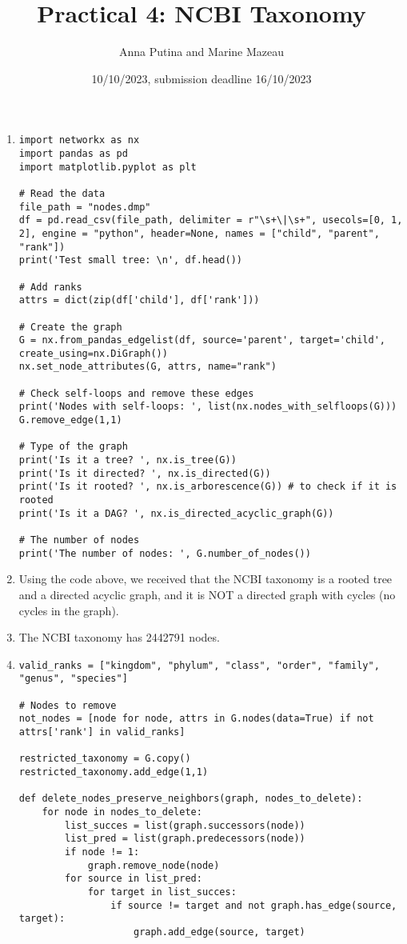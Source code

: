 \documentclass[12 pt,a4paper]{article}
\title{Practical 4: NCBI Taxonomy}
\author{Anna Putina and Marine Mazeau}
\date{10/10/2023, submission deadline 16/10/2023}
\begin{document}
\maketitle
\begin{enumerate}
\item
{}
\begin{verbatim}
import networkx as nx
import pandas as pd
import matplotlib.pyplot as plt

# Read the data
file_path = "nodes.dmp"
df = pd.read_csv(file_path, delimiter = r"\s+\|\s+", usecols=[0, 1, 2], engine = "python", header=None, names = ["child", "parent", "rank"]) 
print('Test small tree: \n', df.head())

# Add ranks
attrs = dict(zip(df['child'], df['rank']))

# Create the graph
G = nx.from_pandas_edgelist(df, source='parent', target='child', create_using=nx.DiGraph())
nx.set_node_attributes(G, attrs, name="rank")

# Check self-loops and remove these edges
print('Nodes with self-loops: ', list(nx.nodes_with_selfloops(G)))
G.remove_edge(1,1)

# Type of the graph
print('Is it a tree? ', nx.is_tree(G))
print('Is it directed? ', nx.is_directed(G))
print('Is it rooted? ', nx.is_arborescence(G)) # to check if it is rooted
print('Is it a DAG? ', nx.is_directed_acyclic_graph(G))

# The number of nodes
print('The number of nodes: ', G.number_of_nodes())
\end{verbatim}
\item
Using the code above, we received that the NCBI taxonomy is a rooted tree and a directed acyclic graph, and it is NOT a directed graph with cycles (no cycles in the graph).

\item 
The NCBI taxonomy has 2442791 nodes.
\item 
{}
\begin{verbatim}
valid_ranks = ["kingdom", "phylum", "class", "order", "family", "genus", "species"]

# Nodes to remove
not_nodes = [node for node, attrs in G.nodes(data=True) if not attrs['rank'] in valid_ranks]

restricted_taxonomy = G.copy()
restricted_taxonomy.add_edge(1,1)

def delete_nodes_preserve_neighbors(graph, nodes_to_delete):
    for node in nodes_to_delete:
        list_succes = list(graph.successors(node)) 
        list_pred = list(graph.predecessors(node))
        if node != 1:
            graph.remove_node(node)
        for source in list_pred:
            for target in list_succes:
                if source != target and not graph.has_edge(source, target):
                    graph.add_edge(source, target)


\end{verbatim}
\end{enumerate}
\end{document}
